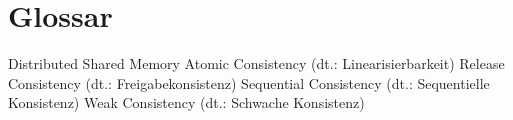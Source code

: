 \chapter{Glossar}
			{Distributed Shared Memory}
			{Atomic Consistency (dt.: Linearisierbarkeit)}
			{Release Consistency (dt.: Freigabekonsistenz)}
			{Sequential Consistency (dt.: Sequentielle Konsistenz)}
			{Weak Consistency (dt.: Schwache Konsistenz)}
